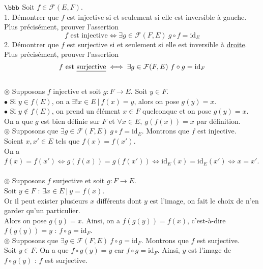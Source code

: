 \documentclass[11pt]{article}
\begin{document}
\begin{exercice}{$\bbb$}{}
    Soit $f \in \mathcal{F}(E,F)$.\\
    1. Démontrer que $f$ est injective si et seulement si elle est inversible à gauche.\\
    Plus précisément, prouver l'assertion
    \begin{equation*}
        f \text{ est injective} \iff \exists g \in \mathcal{F}(F,E) ~ g \circ f = \text{id}_E
    \end{equation*}
    2. Démontrer que $f$ est surjective si et seulement si elle est inversible à \underline{droite}.\\
    Plus précisément, prouver l'assertion
    \begin{equation*}
        f \text{ est \underline{surjective}} \iff \exists g \in \mathcal{F}(F,E) ~ f \circ g = \text{id}_F 
    \end{equation*}
    \tcblower
    \\
    $\circledcirc$ Supposons $f$ injective et soit $g:F\to E$. Soit $y \in F$.\\
    $\bullet$ Si $y\in f(E)$, on a $\exists!x\in E ~ | ~ f(x) = y$, alors on pose $g(y)=x$.\\
    $\bullet$ Si $y\notin f(E)$, on prend un élément $x\in F$ quelconque et on pose $g(y)=x$.\\
    On a que $g$ est bien définie sur $F$ et $\forall x \in E, ~ g(f(x))=x$ par définition.\\[0.15cm]
    $\circledcirc$ Supposons que $\exists g \in \mathcal{F}(F, E) ~ g \circ f = \text{id}_E$. Montrons que $f$ est injective.\\
    Soient $x,x'\in E$ tels que $f(x)=f(x')$.\\
    On a $f(x)=f(x') \iff g(f(x))=g(f(x')) \iff \text{id}_E(x) = \text{id}_E(x') \iff x = x'$.\\[0.2cm]
    \\
    $\circledcirc$ Supposons $f$ surjective et soit $g:F\to E$.\\
    Soit $y \in F$ : $\exists x \in E ~ | ~ y = f(x)$.\\
    Or il peut exister plusieurs $x$ différents dont $y$ est l'image, on fait le choix de n'en garder qu'un particulier.\\
    Alors on pose $g(y) = x$. Ainsi, on a $f(g(y)) = f(x)$, c'est-à-dire $f(g(y))=y$ : $f\circ g = \text{id}_F$.\\[0.15cm]
    $\circledcirc$ Supposons que $\exists g \in \mathcal{F}(F, E) ~ f \circ g = \text{id}_F$. Montrons que $f$ est surjective.\\
    Soit $y \in F$. On a que $f\circ g(y) = y$ car $f \circ g = \text{id}_F$. Ainsi, $y$ est l'image de $f\circ g(y)$ : $f$ est surjective.
\end{exercice}
\end{document}
